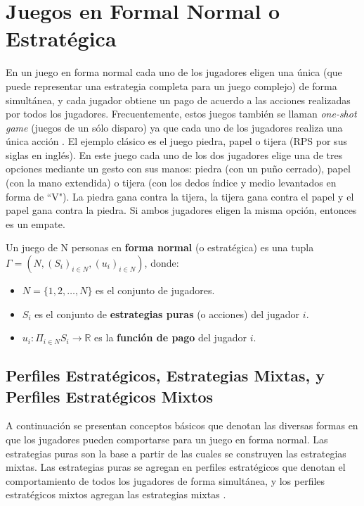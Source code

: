 \chapter{Juegos en Formal Normal o Estratégica}
\label{chapter:forma-normal}

En un juego en forma normal cada uno de los jugadores eligen una única  (que puede representar una estrategia completa para un juego complejo) de forma simultánea, y cada jugador obtiene un pago de acuerdo a las acciones realizadas por todos los jugadores. Frecuentemente, estos juegos también se llaman \textit{one-shot game} (juegos de un sólo disparo) ya que cada uno de los jugadores realiza una única acción \cite{bib:introductionCFR}. El ejemplo clásico es el juego piedra, papel o tijera (RPS por sus siglas en inglés). En este juego cada uno de los dos jugadores elige una de tres opciones mediante un gesto con sus manos: piedra (con un puño cerrado), papel (con la mano extendida) o tijera (con los dedos índice y medio levantados en forma de ``V"). La piedra gana contra la tijera, la tijera gana contra el papel y el papel gana contra la piedra. Si ambos jugadores eligen la misma opción, entonces es un empate.

\begin{definition}
\label{def:forma-normal}
Un juego de N personas en \textbf{forma normal} (o estratégica) es una tupla $\Gamma = (N, (S_i)_{i \in N}, (u_i)_{i \in N})$, donde:
	\begin{itemize}[]
		\item $N = \{1, 2, \dots, N\}$ es el conjunto de jugadores.
		\item  $S_i$ es el conjunto de \textbf{estrategias puras} (o acciones) del jugador $i$.
		\item $u_i : \Pi _{i \in N} S_i \rightarrow \mathbb{R}$ es la \textbf{función de pago} del jugador $i$.
	\end{itemize}
\end{definition}

\section{Perfiles Estratégicos, Estrategias Mixtas, y Perfiles Estratégicos Mixtos}
A continuación se presentan conceptos básicos que denotan las diversas formas en que los jugadores pueden comportarse para un juego en forma normal. Las estrategias puras son la base a partir de las cuales se construyen las estrategias mixtas. Las estrategias puras se agregan en perfiles estratégicos que denotan el comportamiento de todos los jugadores de forma simultánea, y los perfiles estratégicos mixtos agregan las estrategias mixtas \cite{bib:tutorial-existence-nash}.

